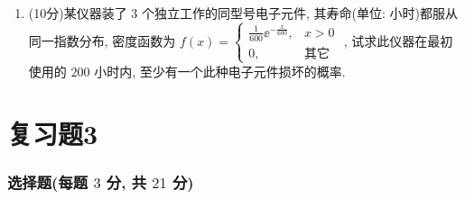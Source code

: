 \begin{enumerate}
	\item (10分)某仪器装了 $3$ 个独立工作的同型号电子元件, 其寿命(单位: 小时)都服从同一指数分布, 密度函数为 $f(x)=
	\begin{cases}
	\frac{1}{600}\ee^{-\frac{x}{600}}, & x>0\\
	0, & \text{其它}
	\end{cases}
	$ , 试求此仪器在最初使用的 $200$ 小时内, 至少有一个此种电子元件损坏的概率.
\end{enumerate}


\section{复习题3}%
\subsubsection{选择题(每题 $3$ 分, 共 $21$ 分)}
